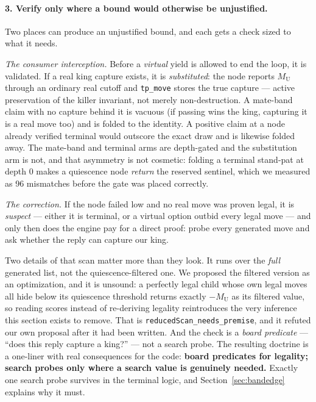 \documentclass[11pt]{article}
\newcommand{\MU}{M_{\mathrm{U}}}    %
\theoremstyle{plain}
\theoremstyle{definition}
\theoremstyle{remark}
\begin{document}
\paragraph{3. Verify only where a bound would otherwise be unjustified.}
Two places can produce an unjustified bound, and each gets a check
sized to what it needs.

\emph{The consumer interception.}  Before a \emph{virtual} yield is
allowed to end the loop, it is validated.  If a real king capture
exists, it is \emph{substituted}: the node reports $\MU$ through an
ordinary real cutoff and \texttt{tp\_move} stores the true capture ---
active preservation of the killer invariant, not merely
non-destruction.  A mate-band claim with no capture behind it is
vacuous (if passing wins the king, capturing it is a real move too) and
is folded to the identity.  A positive claim at a node already verified
terminal would outscore the exact draw and is likewise folded away.
The mate-band and terminal arms are depth-gated and the substitution
arm is not, and that asymmetry is not cosmetic: folding a terminal
stand-pat at depth 0 makes a quiescence node \emph{return} the reserved
sentinel, which we measured as 96 mismatches before the gate was
placed correctly.

\emph{The correction.}  If the node failed low and no real move was
proven legal, it is \emph{suspect} --- either it is terminal, or a
virtual option outbid every legal move --- and only then does the
engine pay for a direct proof: probe every generated move and ask
whether the reply can capture our king.

Two details of that scan matter more than they look.  It runs over the
\emph{full} generated list, not the quiescence-filtered one.  We
proposed the filtered version as an optimization, and it is unsound:
a perfectly legal child whose own legal moves all hide below its
quiescence threshold returns exactly $-\MU$ as its filtered value, so
reading scores instead of re-deriving legality reintroduces the very
inference this section exists to remove.  That is
\texttt{reducedScan\_needs\_premise}, and it refuted our own proposal
after it had been written.  And the check is a \emph{board predicate}
--- ``does this reply capture a king?'' --- not a search probe.  The
resulting doctrine is a one-liner with real consequences for the code:
\textbf{board predicates for legality; search probes only where a
search value is genuinely needed.}  Exactly one search probe survives
in the terminal logic, and Section~\ref{sec:bandedge} explains why it
must.
\end{document}
